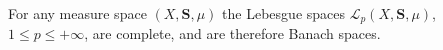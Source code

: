 For any measure space $(X, \mathbf{S}, \mu)$ the Lebesgue spaces $\mathcal{L}_p(X, \mathbf{S}, \mu)$, $1 \leq p \leq +\infty$, are complete, and are therefore Banach spaces.
